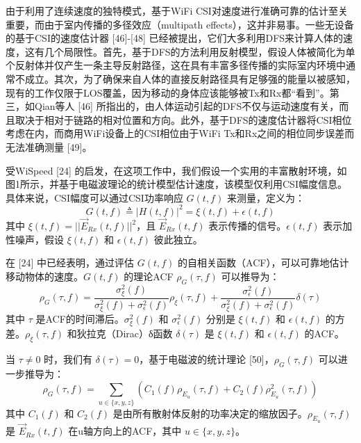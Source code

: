 \documentclass[journal]{IEEEtran}
\begin{document}
由于利用了连续速度的独特模式，基于WiFi CSI对速度进行准确可靠的估计至关重要，而由于室内传播的多径效应（multipath effects），这并非易事。一些无设备的基于CSI的速度估计器 [46]-[48] 已经被提出，它们大多利用DFS来计算人体的速度，这有几个局限性。首先，基于DFS的方法利用反射模型，假设人体被简化为单个反射体并仅产生一条主导反射路径，这在具有丰富多径传播的实际室内环境中通常不成立。其次，为了确保来自人体的直接反射路径具有足够强的能量以被感知，现有的工作仅限于LOS覆盖，因为移动的身体应该能够被Tx和Rx都“看到”。第三，如Qian等人 [46] 所指出的，由人体运动引起的DFS不仅与运动速度有关，而且取决于相对于链路的相对位置和方向。此外，基于DFS的速度估计器将CSI相位考虑在内，而商用WiFi设备上的CSI相位由于WiFi Tx和Rx之间的相位同步误差而无法准确测量 [49]。

受WiSpeed [24] 的启发，在这项工作中，我们假设一个实用的丰富散射环境，如图1所示，并基于电磁波理论的统计模型估计速度，该模型仅利用CSI幅度信息。具体来说，CSI幅度可以通过CSI功率响应 $G(t,f)$ 来测量，定义为：
\begin{equation}
G(t,f) \triangleq |H(t,f)|^{2} = \xi(t,f) + \epsilon(t,f)
\end{equation}
其中 $\xi(t,f) = ||\vec{E}_{Rx}(t,f)||^{2}$，且 $\vec{E}_{Rx}(t,f)$ 表示传播的信号。$\epsilon(t,f)$ 表示加性噪声，假设 $\xi(t,f)$ 和 $\epsilon(t,f)$ 彼此独立。

在 [24] 中已经表明，通过评估 $G(t,f)$ 的自相关函数（ACF），可以可靠地估计移动物体的速度。$G(t,f)$ 的理论ACF $\rho_{G}(\tau,f)$ 可以推导为：
\begin{equation}
\rho_{G}(\tau,f) = \frac{\sigma_{\xi}^{2}(f)}{\sigma_{\xi}^{2}(f)+\sigma_{\epsilon}^{2}(f)}\rho_{\xi}(\tau,f) + \frac{\sigma_{\epsilon}^{2}(f)}{\sigma_{\xi}^{2}(f)+\sigma_{\epsilon}^{2}(f)}\delta(\tau)
\end{equation}
其中 $\tau$ 是ACF的时间滞后。$\sigma_{\xi}^{2}(f)$ 和 $\sigma_{\epsilon}^{2}(f)$ 分别是 $\xi(t,f)$ 和 $\epsilon(t,f)$ 的方差。$\rho_{\xi}(\tau,f)$ 和狄拉克（Dirac）δ函数 $\delta(\tau)$ 是 $\xi(t,f)$ 和 $\epsilon(t,f)$ 的ACF。

当 $\tau \neq 0$ 时，我们有 $\delta(\tau)=0$，基于电磁波的统计理论 [50]，$\rho_{G}(\tau,f)$ 可以进一步推导为：
\begin{equation}
\rho_{G}(\tau,f) = \sum_{u \in \{x,y,z\}} \left(C_{1}(f)\rho_{E_u}(\tau,f) + C_{2}(f)\rho_{E_u}^{2}(\tau,f)\right)
\end{equation}
其中 $C_{1}(f)$ 和 $C_{2}(f)$ 是由所有散射体反射的功率决定的缩放因子。$\rho_{E_u}(\tau,f)$ 是 $\vec{E}_{Rx}(t,f)$ 在u轴方向上的ACF，其中 $u \in \{x,y,z\}$。
\end{document}
